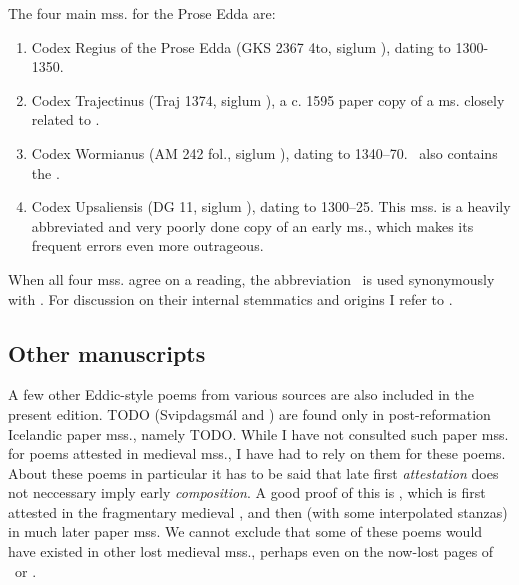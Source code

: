 The four main mss. for the Prose Edda are:%

\begin{enumerate}
  \item Codex Regius of the Prose Edda (GKS 2367 4to, siglum \RegiusProse), dating to 1300-1350.
  \item Codex Trajectinus (Traj 1374, siglum \Trajectinus), a c. 1595 paper copy of a ms. closely related to \RegiusProse.
  \item Codex Wormianus (AM 242 fol., siglum \Wormianus), dating to 1340–70. \Wormianus\ also contains the \Rigsthula.
  \item Codex Upsaliensis (DG 11, siglum \Upsaliensis), dating to 1300–25.  This mss. is a heavily abbreviated and very poorly done copy of an early ms., which makes its frequent errors even more outrageous.
\end{enumerate}

When all four mss. agree on a reading, the abbreviation \GylfMS\ is used synonymously with \RegiusProse\Trajectinus\Wormianus\Upsaliensis.  For discussion on their internal stemmatics and origins I refer to \textcite{Haukur2017}.

\subsection{Other manuscripts}

A few other Eddic-style poems from various sources are also included in the present edition.  TODO (Svipdagsmál and \Grougaldr) are found only in post-reformation Icelandic paper mss., namely TODO.  While I have not consulted such paper mss. for poems attested in medieval mss., I have had to rely on them for these poems.  About these poems in particular it has to be said that late first \emph{attestation} does not neccessary imply early \emph{composition}.  A good proof of this is \Baldrsdraumar, which is first attested in the fragmentary medieval \AM, and then (with some interpolated stanzas) in much later paper mss.  We cannot exclude that some of these poems would have existed in other lost medieval mss., perhaps even on the now-lost pages of \Regius\ or \AM.
